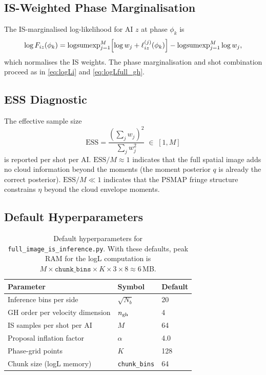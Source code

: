\documentclass[11pt,a4paper]{article}
\begin{document}
\subsection{IS-Weighted Phase Marginalisation}

The IS-marginalised log-likelihood for AI $z$ at phase $\phi_k$ is
\begin{equation}
  \log F_{iz}(\phi_k)
  = \operatorname{logsumexp}_{j=1}^M
    \Bigl[\log w_j + \ell_{iz}^{(j)}(\phi_k)\Bigr]
    - \operatorname{logsumexp}_{j=1}^M \log w_j,
  \label{eq:logF_iz_is}
\end{equation}
which normalises the IS weights.  The phase marginalisation and shot
combination proceed as in \eqref{eq:logLi} and \eqref{eq:logLfull_gh}.

\subsection{ESS Diagnostic}

The effective sample size
\begin{equation}
  \mathrm{ESS}
  = \frac{(\sum_j w_j)^2}{\sum_j w_j^2}
  \;\in\; [1, M]
  \label{eq:ess_full}
\end{equation}
is reported per shot per AI.  $\mathrm{ESS}/M \approx 1$ indicates that
the full spatial image adds no cloud information beyond the moments
(the moment posterior $q$ is already the correct posterior).
$\mathrm{ESS}/M \ll 1$ indicates that the PSMAP fringe structure
constrains $\eta$ beyond the cloud envelope moments.

\subsection{Default Hyperparameters}

\begin{table}[h]
\centering
\begin{tabular}{lll}
\toprule
Parameter & Symbol & Default \\
\midrule
Inference bins per side          & $\sqrt{N_b}$ & 20 \\
GH order per velocity dimension  & $n_{\rm gh}$ & 4 \\
IS samples per shot per AI       & $M$ & 64 \\
Proposal inflation factor        & $\alpha$ & 4.0 \\
Phase-grid points                & $K$ & 128 \\
Chunk size (logL memory)         & \texttt{chunk\_bins} & 64 \\
\bottomrule
\end{tabular}
\caption{Default hyperparameters for \texttt{full\_image\_is\_inference.py}.
With these defaults, peak RAM for the logL computation is
$M \times \texttt{chunk\_bins} \times K \times 3 \times 8 \approx 6$\,MB.}
\label{tab:full_is_params}
\end{table}
\end{document}
